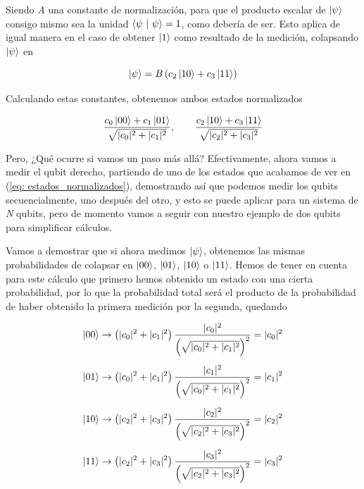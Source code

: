 \documentclass{article}
\numberwithin{equation}{section} %
\begin{document}
    Siendo \textit{A} una constante de normalización, para que el producto escalar de \( \ket{\psi} \) consigo mismo sea la unidad \( \braket{\psi \ | \ \psi} = 1 \), como debería de ser. Esto aplica de igual manera en el caso de obtener \( \ket{1} \) como resultado de la medición, colapsando \( \ket{\psi} \) en 

    \begin{equation*}
        \ket{\psi} = B \left( c_{2} \ket{1 0} + c_{3} \ket{1 1} \right)
    \end{equation*}

    \vspace{2.5mm}

    Calculando estas constantes, obtenemos ambos estados normalizados

    \begin{equation}
        \frac{c_{0} \ket{0 0} + c_{1} \ket{0 1}}{\sqrt{| c_{0} |^{2} + | c_{1} |^{2}}}, \qquad \frac{c_{2} \ket{1 0} + c_{3} \ket{1 1}}{\sqrt{| c_{2} |^{2} + | c_{3} |^{2}}}
        \label{eq: estados_normalizados}
    \end{equation}

    \vspace{2.5mm}

    Pero, ¿Qué ocurre si vamos un paso más allá? Efectivamente, ahora vamos a medir el qubit derecho, partiendo de uno de los estados que acabamos de ver en (\ref{eq: estados_normalizados}), demostrando así que podemos medir los qubits secuencialmente, uno después del otro, y esto se puede aplicar para un sistema de \textit{N} qubits, pero de momento vamos a seguir con nuestro ejemplo de dos qubits para simplificar cálculos.

    \vspace{5mm}

    Vamos a demostrar que si ahora medimos \( \ket{\psi} \), obtenemos las mismas probabilidades de colapsar en \( \ket{0 0} \), \( \ket{0 1} \), \( \ket{1 0} \) o \( \ket{1 1} \). Hemos de tener en cuenta para este cálculo que primero hemos obtenido un estado con una cierta probabilidad, por lo que la probabilidad total será el producto de la probabilidad de haber obtenido la primera medición por la segunda, quedando

    \begin{align*}
        \ket{0 0} &\rightarrow \left(| c_{0} |^{2} + | c_{1} |^{2}\right) \frac{| c_{0} |^{2}}{\left( \sqrt{| c_{0} |^{2} + | c_{1} |^{2}} \right)^{2}} = | c_{0} |^{2} \\[5pt]
        \ket{0 1} &\rightarrow \left(| c_{0} |^{2} + | c_{1} |^{2}\right) \frac{| c_{1} |^{2}}{\left( \sqrt{| c_{0} |^{2} + | c_{1} |^{2}} \right)^{2}} = | c_{1} |^{2} \\[5pt]
        \ket{1 0} &\rightarrow \left(| c_{2} |^{2} + | c_{3} |^{2}\right) \frac{| c_{2} |^{2}}{\left( \sqrt{| c_{2} |^{2} + | c_{3} |^{2}} \right)^{2}} = | c_{2} |^{2} \\[5pt]
        \ket{1 1} &\rightarrow \left(| c_{2} |^{2} + | c_{3} |^{2}\right) \frac{| c_{3} |^{2}}{\left( \sqrt{| c_{2} |^{2} + | c_{3} |^{2}} \right)^{2}} = | c_{3} |^{2} \\[5pt]
    \end{align*}
\end{document}
